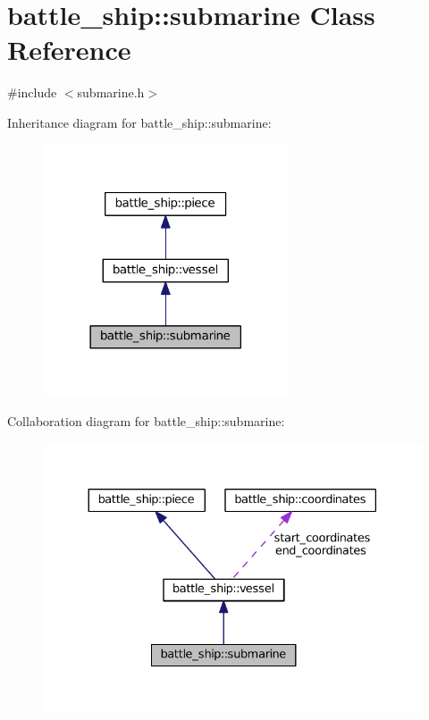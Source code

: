 \hypertarget{classbattle__ship_1_1submarine}{}\section{battle\+\_\+ship\+:\+:submarine Class Reference}
\label{classbattle__ship_1_1submarine}


{\ttfamily \#include $<$submarine.\+h$>$}



Inheritance diagram for battle\+\_\+ship\+:\+:submarine\+:
\nopagebreak
\begin{figure}[H]
\begin{center}
\leavevmode
\includegraphics[width=206pt]{classbattle__ship_1_1submarine__inherit__graph}
\end{center}
\end{figure}


Collaboration diagram for battle\+\_\+ship\+:\+:submarine\+:
\nopagebreak
\begin{figure}[H]
\begin{center}
\leavevmode
\includegraphics[width=330pt]{classbattle__ship_1_1submarine__coll__graph}
\end{center}
\end{figure}
